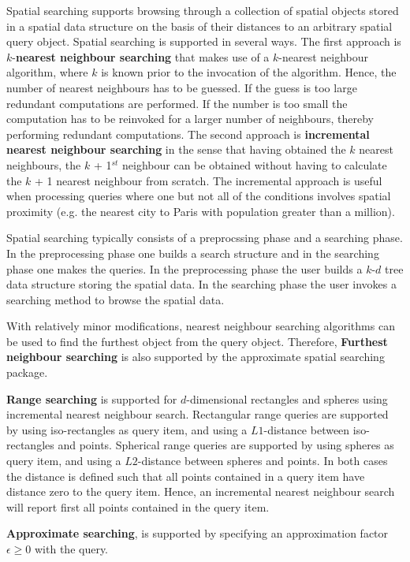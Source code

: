 Spatial searching supports browsing through a collection of spatial objects
stored in a spatial data structure on the basis of their distances to an arbitrary spatial
query object.
Spatial searching is supported in several ways. 
The first approach is $k$-{\bf nearest neighbour searching} that makes use of a $k$-nearest neighbour
algorithm, where $k$ is known prior to the invocation of the algorithm.
Hence, the number of nearest neighbours has to be
guessed. If the guess is too large redundant computations are performed.
If the number is too small the computation has to be  
reinvoked for a larger number of neighbours, thereby performing redundant computations.
The second approach is {\bf incremental nearest neighbour searching} in the sense that having obtained
the $k$ nearest neighbours, the $k$ + 1$^{st}$ neighbour can be obtained without
having to calculate the $k$ + 1 nearest neighbour from scratch.
The incremental approach is useful when processing queries where
one but not all of the conditions involves spatial proximity (e.g. the nearest city to Paris with
population greater than a million).

Spatial searching typically consists of a preprocssing phase and a searching phase. 
In the preprocessing phase one builds a search structure 
and in the searching phase 
one makes the queries. 
In the preprocessing phase the user builds a $k$-$d$ tree data structure storing the spatial data.
In the searching phase the user invokes a searching method to browse the spatial data.

With relatively minor modifications, nearest neighbour searching algorithms can be
used to find the furthest object from the query object. 
Therefore, {\bf Furthest neighbour searching} is also supported
by the approximate spatial searching package.

{\bf Range searching}
is supported for $d$-dimensional rectangles and spheres using incremental nearest neighbour search. 
Rectangular range queries are supported by 
using iso-rectangles as query item, and using a $L1$-distance between iso-rectangles and points.
Spherical range queries are supported by using spheres as query item, and using a $L2$-distance
between spheres and points.
In both cases the distance is defined such that all points contained in a query item have distance zero
to the query item. Hence, an incremental nearest neighbour search will report first all points
contained in the query item.  

{\bf Approximate searching}, is supported by
specifying an approximation factor $\epsilon \geq 0$ with the query.

